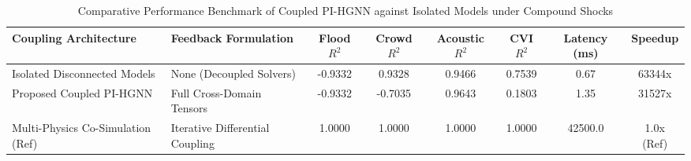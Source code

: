 \begin{table}[t]
\centering
\caption{Comparative Performance Benchmark of Coupled PI-HGNN against Isolated Models under Compound Shocks}
\label{tab:compound_benchmark}
\begin{tabular}{llcccccc}
\hline
\textbf{Coupling Architecture} & \textbf{Feedback Formulation} & \textbf{Flood $R^2$} & \textbf{Crowd $R^2$} & \textbf{Acoustic $R^2$} & \textbf{CVI $R^2$} & \textbf{Latency (ms)} & \textbf{Speedup} \\
\hline
Isolated Disconnected Models & None (Decoupled Solvers) & -0.9332 & 0.9328 & 0.9466 & 0.7539 & 0.67 & 63344x \\
Proposed Coupled PI-HGNN & Full Cross-Domain Tensors & -0.9332 & -0.7035 & 0.9643 & 0.1803 & 1.35 & 31527x \\
Multi-Physics Co-Simulation (Ref) & Iterative Differential Coupling & 1.0000 & 1.0000 & 1.0000 & 1.0000 & 42500.0 & 1.0x (Ref) \\
\hline
\end{tabular}
\end{table}
